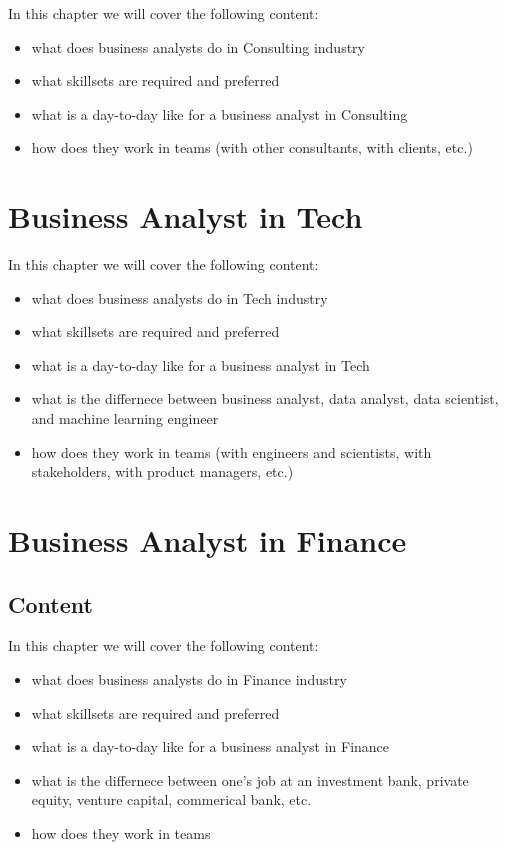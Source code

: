 \documentclass[
]{book}
\providecommand{\tightlist}{%
  \setlength{\itemsep}{0pt}\setlength{\parskip}{0pt}}
\begin{document}
In this chapter we will cover the following content:

\begin{itemize}
\tightlist
\item
  what does business analysts do in Consulting industry
\item
  what skillsets are required and preferred
\item
  what is a day-to-day like for a business analyst in Consulting
\item
  how does they work in teams (with other consultants, with clients, etc.)
\end{itemize}

\hypertarget{business-analyst-in-tech}{%
\chapter{Business Analyst in Tech}\label{business-analyst-in-tech}}

In this chapter we will cover the following content:

\begin{itemize}
\tightlist
\item
  what does business analysts do in Tech industry
\item
  what skillsets are required and preferred
\item
  what is a day-to-day like for a business analyst in Tech
\item
  what is the differnece between business analyst, data analyst, data scientist, and machine learning engineer
\item
  how does they work in teams (with engineers and scientists, with stakeholders, with product managers, etc.)
\end{itemize}

\hypertarget{business-analyst-in-finance}{%
\chapter{Business Analyst in Finance}\label{business-analyst-in-finance}}

\hypertarget{content}{%
\section{Content}\label{content}}

In this chapter we will cover the following content:

\begin{itemize}
\tightlist
\item
  what does business analysts do in Finance industry
\item
  what skillsets are required and preferred
\item
  what is a day-to-day like for a business analyst in Finance
\item
  what is the differnece between one's job at an investment bank, private equity, venture capital, commerical bank, etc.
\item
  how does they work in teams
\end{itemize}

  
\end{document}
